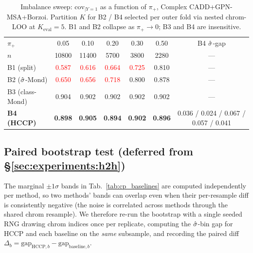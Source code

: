 \begin{table}[h]
\centering
\small
\caption{Imbalance sweep: $\mathrm{cov}_{|Y=1}$ as a function of $\pi_{+}$, Complex CADD+GPN-MSA+Borzoi. Partition $K$ for B2 / B4 selected per outer fold via nested chrom-LOO at $K_{\mathrm{eval}} = 5$. B1 and B2 collapse as $\pi_{+} \to 0$; B3 and B4 are insensitive.}
\label{tab:imbsweep}
\setlength{\tabcolsep}{6pt}
\begin{tabular}{lccccc|c}
\toprule
$\pi_{+}$       & 0.05  & 0.10  & 0.20  & 0.30  & 0.50  & B4 $\hat{\sigma}$-gap \\
$n$             & 10800 & 11400 & 5700  & 3800  & 2280  & --- \\
\midrule
B1 (split)      & \textcolor{red}{0.587} & \textcolor{red}{0.616} & \textcolor{red}{0.664} & \textcolor{red}{0.725} & 0.810 & --- \\
B2 ($\hat{\sigma}$-Mond) & \textcolor{red}{0.650} & \textcolor{red}{0.656} & \textcolor{red}{0.718} & 0.800 & 0.878 & --- \\
B3 (class-Mond) & 0.904 & 0.902 & 0.902 & 0.902 & 0.902 & --- \\
\textbf{B4 (HCCP)} & \textbf{0.898} & \textbf{0.905} & \textbf{0.894} & \textbf{0.902} & \textbf{0.896} & 0.036 / 0.024 / 0.067 / 0.057 / 0.041 \\
\bottomrule
\end{tabular}
\end{table}

\subsection{Paired bootstrap test (deferred from \S\ref{sec:experiments:h2h})}
\label{app:tables:paired_bootstrap}

The marginal $\pm 1\sigma$ bands in Tab.~\ref{tab:cp_baselines} are computed independently per method, so two methods' bands can overlap even when their per-resample diff is consistently negative (the noise is correlated across methods through the shared chrom resample). We therefore re-run the bootstrap with a single seeded RNG drawing chrom indices once per replicate, computing the $\hat{\sigma}$-bin gap for HCCP and each baseline on the \emph{same} subsample, and recording the paired diff $\Delta_b = \mathrm{gap}_{\mathrm{HCCP},b} - \mathrm{gap}_{\mathrm{baseline},b}$.

